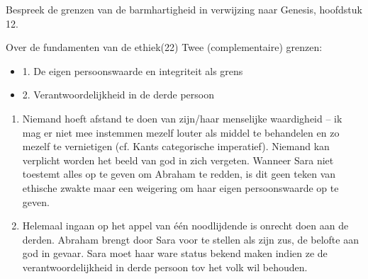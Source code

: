 \documentclass[main.tex]{subfiles}
\begin{document}
\begin{examenvraag}
    \begin{vraag}
        Bespreek de grenzen van de barmhartigheid in verwijzing naar Genesis, hoofdstuk 12.
    \end{vraag}

    \begin{antwoord}
        \begin{citaat}{Over de fundamenten van de ethiek(22)}
            Twee (complementaire) grenzen:
            \begin{itemize}
                \item 1. De eigen persoonswaarde en integriteit als grens
                \item 2. Verantwoordelijkheid in de derde persoon
            \end{itemize}
        \end{citaat}

		\begin{enumerate}
			\item Niemand hoeft afstand te doen van zijn/haar menselijke waardigheid – ik mag er niet
			        mee instemmen mezelf louter als middel te behandelen en zo mezelf te vernietigen (cf. Kants categorische imperatief).
			        Niemand kan verplicht worden het beeld van god in zich vergeten.
			Wanneer Sara niet toestemt alles op te geven om Abraham te 
			redden,‭ ‬is dit geen teken van ethische zwakte maar een weigering 
			om haar eigen persoonswaarde op te geven.‭ 
			\item Helemaal ingaan op het appel van \'{e}\'{e}n noodlijdende 
			is onrecht doen aan de derden.
			Abraham brengt door Sara voor te stellen als zijn zus, de belofte 
			aan god in gevaar. Sara moet haar ware status bekend maken indien 
			ze de verantwoordelijkheid in derde persoon tov het volk wil 
			behouden.
		\end{enumerate}


    \end{antwoord}
\end{examenvraag}
\end{document}
